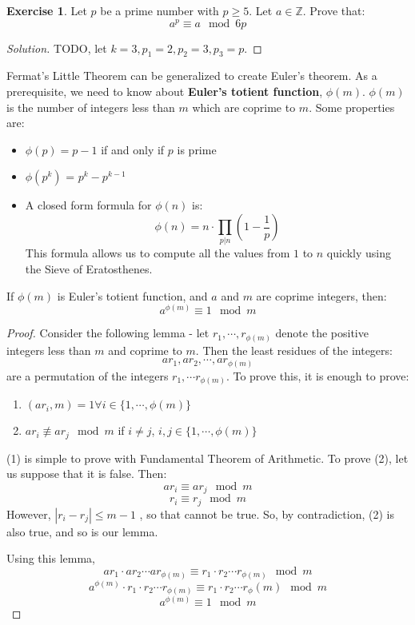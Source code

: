 \documentclass[12pt,letterpaper]{amsbook}
\theoremstyle{definition}
\newtheorem*{exercise}{Exercise}
\newenvironment{solution}
  {\renewcommand\qedsymbol{$\blacksquare$}\begin{proof}[Solution]}
  {\end{proof}}
\newcommand{\Z}{\mathbb{Z}}
\begin{document}
\begin{exercise}
  Let $p$ be a prime number with $p \geq 5$. Let $a \in \Z$. Prove that:
  \[a^p \equiv a \mod 6p\]
\end{exercise}
\begin{solution}
  TODO, let $k =3, p_1 = 2, p_2 = 3, p_3 = p$. 
\end{solution}

Fermat's Little Theorem can be generalized to create Euler's theorem. As a prerequisite, we need to know about \textbf{Euler's totient function}, $\phi(m)$. $\phi(m)$ is the number of integers less than $m$ which are coprime to $m$. Some properties are:

\begin{itemize}
  \item $\phi(p) = p-1$ if and only if $p$ is prime
  \item $\phi(p^k)$ = $p^k - p^{k-1}$
  \item A closed form formula for $\phi(n)$ is:
    \[\phi(n) = n \cdot \prod_{p|n} \left (1 - \frac{1}{p} \right )\]
    This formula allows us to compute all the values from $1$ to $n$ quickly using the Sieve of Eratosthenes.
\end{itemize}

\begin{theorem}
  If $\phi(m)$ is Euler's totient function, and $a$ and $m$ are coprime integers, then:
  \[a^{\phi(m)} \equiv 1 \mod m\]
\end{theorem}
\begin{proof}
  Consider the following lemma - let $r_1, \cdots , r_{\phi(m)}$ denote the positive integers less than $m$ and coprime to $m$. Then the least residues of the integers:
  \[ar_1, ar_2, \cdots, ar_{\phi(m)}\]
  are a permutation of the integers $r_1, \cdots r_{\phi(m)}$.
  To prove this, it is enough to prove:
  \begin{enumerate}
    \item $(ar_i, m) = 1 \forall i \in \{1, \cdots, \phi(m)\}$
    \item $ar_i \not \equiv ar_j \mod m$ if $i \neq j$, $i,j \in \{1, \cdots, \phi(m)\}$
  \end{enumerate}
  (1) is simple to prove with Fundamental Theorem of Arithmetic. To prove (2), let us suppose that it is false. Then:
  \[ar_i \equiv ar_j \mod m\]
  \[r_i \equiv r_j \mod m\]
  However, $|r_i-r_j| \leq m-1$ , so that cannot be true. So, by contradiction, (2) is also true, and so is our lemma.

  Using this lemma, 
  \[ar_1 \cdot ar_2 \cdots ar_{\phi(m)} \equiv r_1 \cdot r_2 \cdots r_{\phi(m)} \mod m\]
  \[a^{\phi(m)} \cdot r_1 \cdot r_2 \cdots r_{\phi(m)} \equiv r_1 \cdot r_2 \cdots r_\phi(m) \mod m\]
  \[a^{\phi(m)} \equiv 1 \mod m\]
\end{proof}
\end{document}
